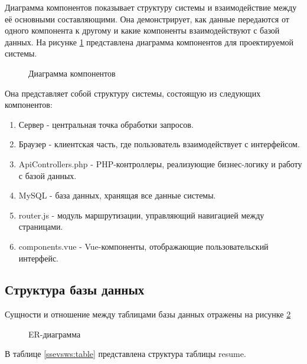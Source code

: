 Диаграмма компонентов показывает структуру системы и взаимодействие между её основными составляющими. Она демонстрирует, как данные передаются от одного компонента к другому и какие компоненты взаимодействуют с базой данных. На рисунке
\ref{dcc:image} представлена диаграмма компонентов для проектируемой системы.


\begin{figure}[H]
	\caption{Диаграмма компонентов}
	\label{dcc:image}
\end{figure}

Она представляет собой структуру системы, состоящую из следующих компонентов:
\begin{enumerate}
	\item Сервер - центральная точка обработки запросов.
	\item Браузер - клиентская часть, где пользователь взаимодействует с интерфейсом.
	\item ApiControllers.php - PHP-контроллеры, реализующие бизнес-логику и работу с базой данных.
	\item MySQL - база данных, хранящая все данные системы.
	\item router.js - модуль маршрутизации, управляющий навигацией между страницами.
	\item components.vue - Vue-компоненты, отображающие пользовательский интерфейс.
\end{enumerate}

\subsection{Структура базы данных}

Сущности и отношение между таблицами базы данных отражены на
рисунке \ref{db:image}

\begin{figure}[H]
	\center{\texttt{[image: db]}}
	\caption{ER-диаграмма}
	\label{db:image}
\end{figure}


В таблице \ref{ssevsws:table} представлена структура таблицы resume.

